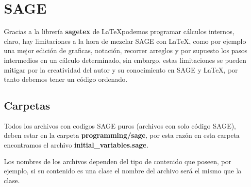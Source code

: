 {	    \section{SAGE}
	    Gracias a la librería \textbf{sagetex} de \LaTeX\space podemos programar cálculos internos, claro, hay limitaciones a la hora de mezclar SAGE con \LaTeX\space, como por ejemplo una mejor edición de graficas, notación, recorrer arreglos y por supuesto los pasos intermedios en un cálculo determinado, sin embargo, estas limitaciones se pueden mitigar por la creatividad del autor y su conocimiento en SAGE y \LaTeX\space, por tanto debemos tener un código ordenado. 
	    \subsection{Carpetas}
	    Todos los archivos con codigos SAGE puros (archivos con solo código SAGE), deben estar en la carpeta \textbf{programming/sage}, por esta razón en esta carpeta encontramos el archivo \textbf{initial\_variables.sage}.
	    \begin{boxbasic}
	    	Los nombres de los archivos dependen del tipo de contenido que poseen, por ejemplo, si su contenido es una clase el nombre del archivo será el mismo que la clase.
	    \end{boxbasic}
}
